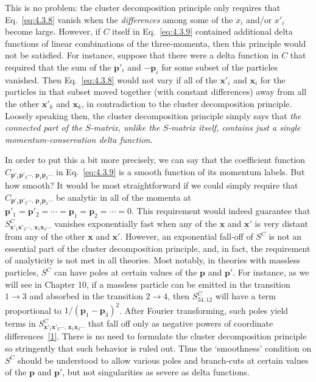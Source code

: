 This is no problem: the cluster decomposition principle only requires that
Eq.~\eqref{eq:4.3.8} vanish when the \emph{differences} among some of the $x_i$ and/or
$x'_i$ become large. However, if $C$ itself in Eq.~\eqref{eq:4.3.9} contained additional
delta functions of linear combinations of the three-momenta, then this
principle would not be satisfied. For instance, suppose that there were a delta
function in $C$ that required that the sum of the $\mathbf p'_i$ and
$-\mathbf p_i$ for some subset of the particles vanished. Then Eq.~\eqref{eq:4.3.8}
would not vary if all of the $\mathbf x'_i$ and $\mathbf x_i$ for the particles
in that subset moved together (with constant differences) away from all the
other $\mathbf x'_k$ and $\mathbf x_k$, in contradiction to the cluster
decomposition principle. Loosely speaking then, the cluster decomposition
principle simply says that \emph{the connected part of the $S$-matrix, unlike
the $S$-matrix itself, contains just a single momentum-conservation delta
function}.

In order to put this a bit more precisely, we can say that the coefficient
function
$C_{\mathbf p'_1\mathbf p'_2\cdots,\,
    \mathbf p_1\mathbf p_2\cdots}$
in Eq.~\eqref{eq:4.3.9} is a smooth function of its momentum labels. But how smooth?
It would be most straightforward if we could simply require that
$C_{\mathbf p'_1\mathbf p'_2\cdots,\,
    \mathbf p_1\mathbf p_2\cdots}$
be analytic in all of the momenta at
$\mathbf p'_1=\mathbf p'_2=\cdots=\mathbf p_1=\mathbf p_2=\cdots=0$.
This requirement would indeed guarantee that
$S^C_{\mathbf x'_1\mathbf x'_2\cdots,\,
     \mathbf x_1\mathbf x_2\cdots}$
vanishes exponentially fast when any of the $\mathbf x$ and $\mathbf x'$ is
very distant from any of the other $\mathbf x$ and $\mathbf x'$. However, an
exponential fall-off of $S^C$ is not an essential part of the cluster
decomposition principle, and, in fact, the requirement of analyticity is not
met in all theories. Most notably, in theories with massless particles, $S^C$
can have poles at certain values of the $\mathbf p$ and $\mathbf p'$. For
instance, as we will see in Chapter 10, if a massless particle can be emitted in
the transition $1\to3$ and absorbed in the transition $2\to4$, then
$S^C_{34,12}$ will have a term proportional to
$1/(\mathbf p_1-\mathbf p_3)^2$. After Fourier transforming, such poles yield
terms in
$S^C_{\mathbf x'_1\mathbf x'_2\cdots,\,
     \mathbf x_1\mathbf x_2\cdots}$
that fall off only as negative powers of coordinate differences~\hyperref[ref:4.1]{[1]}. There is
no need to formulate the cluster decomposition principle so stringently that
such behavior is ruled out. Thus the `smoothness' condition on $S^C$ should be
understood to allow various poles and branch-cuts at certain values of the
$\mathbf p$ and $\mathbf p'$, but not singularities as severe as delta
functions.
